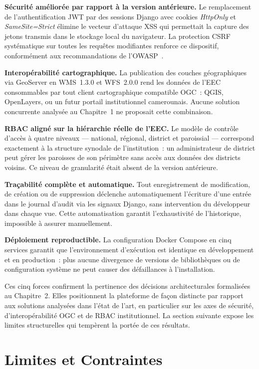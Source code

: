 \textbf{Sécurité améliorée par rapport à la version antérieure.}
Le remplacement de l'authentification JWT par des sessions Django avec
cookies \textit{HttpOnly} et \textit{SameSite=Strict} élimine le vecteur
d'attaque XSS qui permettait la capture des jetons transmis dans le stockage
local du navigateur. La protection CSRF systématique sur toutes les
requêtes modifiantes renforce ce dispositif, conformément aux recommandations
de l'OWASP~\cite{owasp2021}.

\textbf{Interopérabilité cartographique.}
La publication des couches géographiques via GeoServer en WMS~1.3.0 et
WFS~2.0.0 rend les données de l'EEC consommables par tout client
cartographique compatible OGC~: QGIS, OpenLayers, ou un futur portail
institutionnel camerounais. Aucune solution concurrente analysée au
Chapitre~1 ne proposait cette combinaison.

\textbf{RBAC aligné sur la hiérarchie réelle de l'EEC.}
Le modèle de contrôle d'accès à quatre niveaux --- national, régional,
district et paroissial --- correspond exactement à la structure synodale
de l'institution~: un administrateur de district peut gérer les paroisses
de son périmètre sans accès aux données des districts voisins. Ce niveau
de granularité était absent de la version antérieure.

\textbf{Traçabilité complète et automatique.}
Tout enregistrement de modification, de création ou de suppression
déclenche automatiquement l'écriture d'une entrée dans le journal d'audit
via les signaux Django, sans intervention du développeur dans chaque vue.
Cette automatisation garantit l'exhaustivité de l'historique, impossible
à assurer manuellement.

\textbf{Déploiement reproductible.}
La configuration Docker Compose en cinq services garantit que l'environnement
d'exécution est identique en développement et en production~: plus aucune
divergence de versions de bibliothèques ou de configuration système ne peut
causer des défaillances à l'installation.

Ces cinq forces confirment la pertinence des décisions architecturales
formalisées au Chapitre~2. Elles positionnent la plateforme de façon
distincte par rapport aux solutions analysées dans l'état de l'art, en
particulier sur les axes de sécurité, d'interopérabilité OGC et de
RBAC institutionnel. La section suivante expose les limites structurelles
qui tempèrent la portée de ces résultats.

\section{Limites et Contraintes}
\label{sec:limites}

